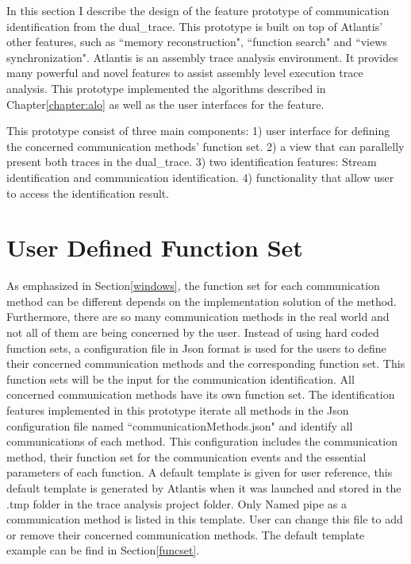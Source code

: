 

\label{chapter:newsol}
In this section I describe the design of the feature prototype of communication identification from the dual\_trace. This prototype is built on top of Atlantis' other features, such as ``memory reconstruction", ``function search" and ``views synchronization". Atlantis is an assembly trace analysis environment. It provides many powerful and novel features to assist assembly level execution trace analysis.\cite{huang2017atlantis} This prototype implemented the algorithms described in Chapter\ref{chapter:alo} as well as the user interfaces for the feature.

This prototype consist of three main components: 1) user interface for defining the concerned communication methods' function set. 2) a view that can parallelly present both traces in the dual\_trace. 3) two identification features: Stream identification and communication identification. 4) functionality that allow user to access the identification result.


\section{User Defined Function Set}
As emphasized in Section\ref{windows}, the function set for each communication method can be different depends on the implementation solution of the method. Furthermore, there are so many communication methods in the real world and not all of them are being concerned by the user. Instead of using hard coded function sets, a configuration file in Json format is used for the users to define their concerned communication methods and the corresponding function set. This function sets will be the input for the communication identification. All concerned communication methods have its own function set. The identification features implemented in this prototype iterate all methods in the Json configuration file named ``communicationMethods.json" and identify all communications of each method. This configuration includes the communication method, their function set for the communication events and the essential parameters of each function. A default template is given for user reference, this default template is generated by Atlantis when it was launched and stored in the .tmp folder in the trace analysis project folder. Only Named pipe as a communication method is listed in this template. User can change this file to add or remove their concerned communication methods. The default template example can be find in Section\ref{funcset}.

